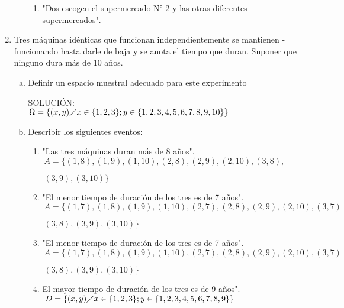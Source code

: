 \documentclass[13pt,a4paper]{article}
\begin{document}
\begin{enumerate}
\begin{enumerate}[a) ]
\begin{enumerate}[A: ]
\item "Dos escogen el supermercado N° 2 y las otras diferentes supermercados".

\end{enumerate}

\end{enumerate}

\item Tres máquinas idénticas que funcionan independientemente se mantienen -
funcionando hasta darle de baja y se anota el tiempo que duran. Suponer
que ninguno dura más de 10 años.

\begin{enumerate}[a) ]

\item Definir un espacio muestral adecuado para este experimento

SOLUCIÓN:\\[0.2cm]
$\Omega=\lbrace (x,y) \diagup x \in \lbrace1,2,3\rbrace ; y \in \lbrace1,2,3,4,5,6,7,8,9,10\rbrace \rbrace$

\item Describir los siguientes eventos:

\begin{enumerate}[A: ]

\item "Las tres máquinas duran más de 8 años".\\[0.2cm]
$\ A=\lbrace (1,8),(1,9),(1,10),(2,8),(2,9),(2,10),(3,8),$

$ \ (3,9),(3,10)\rbrace$

\item "El menor tiempo de duración de los tres es de 7 años".\\[0.2cm]
$\ A=\lbrace (1,7),(1,8),(1,9),(1,10),(2,7),(2,8),(2,9),(2,10),(3,7)$

$\ (3,8),(3,9),(3,10)\rbrace$

\item "El menor tiempo de duración de los tres es de 7 años".\\[0.2cm]
$\ A=\lbrace (1,7),(1,8),(1,9),(1,10),(2,7),(2,8),(2,9),(2,10),(3,7)$


$\ (3,8),(3,9),(3,10)\rbrace$
\item El mayor tiempo de duración de los tres es de 9 años".\\[0.2cm]
$\ D=\lbrace (x,y) \diagup x \in \lbrace1,2,3\rbrace ; y \in \lbrace1,2,3,4,5,6,7,8,9\rbrace \rbrace$


\end{enumerate}


\end{enumerate}
\end{enumerate}
\end{document}
